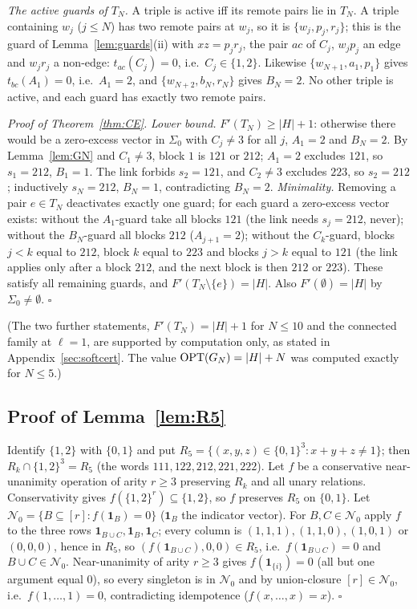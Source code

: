 \emph{The active guards of $T_N$.} A triple is active iff its remote pairs lie in $T_N$. A triple containing $w_j$ ($j\le N$) has two remote pairs at $w_j$, so it is $\{w_j,p_j,r_j\}$; this is the guard of Lemma~\ref{lem:guards}(ii) with $xz=p_jr_j$, the pair $ac$ of $C_j$, $w_jp_j$ an edge and $w_jr_j$ a non-edge: $t_{ac}(C_j)=0$, i.e.\ $C_j\in\{1,2\}$. Likewise $\{w_{N+1},a_1,p_1\}$ gives $t_{bc}(A_1)=0$, i.e.\ $A_1=2$, and $\{w_{N+2},b_N,r_N\}$ gives $B_N=2$. No other triple is active, and each guard has exactly two remote pairs.

\emph{Proof of Theorem~\ref{thm:CE}.} \emph{Lower bound.} $F'(T_N)\ge|H|+1$: otherwise there would be a zero-excess vector in $\Sigma_0$ with $C_j\ne3$ for all $j$, $A_1=2$ and $B_N=2$. By Lemma~\ref{lem:GN} and $C_1\ne3$, block $1$ is $121$ or $212$; $A_1=2$ excludes $121$, so $s_1=212$, $B_1=1$. The link forbids $s_2=121$, and $C_2\ne3$ excludes $223$, so $s_2=212$; inductively $s_N=212$, $B_N=1$, contradicting $B_N=2$. \emph{Minimality.} Removing a pair $e\in T_N$ deactivates exactly one guard; for each guard a zero-excess vector exists: without the $A_1$-guard take all blocks $121$ (the link needs $s_j=212$, never); without the $B_N$-guard all blocks $212$ ($A_{j+1}=2$); without the $C_k$-guard, blocks $j<k$ equal to $212$, block $k$ equal to $223$ and blocks $j>k$ equal to $121$ (the link applies only after a block $212$, and the next block is then $212$ or $223$). These satisfy all remaining guards, and $F'(T_N\setminus\{e\})=|H|$. Also $F'(\emptyset)=|H|$ by $\Sigma_0\ne\emptyset$. \hfill$\square$

(The two further statements, $F'(T_N)=|H|+1$ for $N\le10$ and the connected family at $\ell=1$, are supported by computation only, as stated in Appendix~\ref{sec:softcert}. The value $\mathrm{OPT}(G_N)=|H|+N$ was computed exactly for $N\le5$.)

\subsection{Proof of Lemma~\ref{lem:R5}}\label{app:softR5}
Identify $\{1,2\}$ with $\{0,1\}$ and put $R_5=\{(x,y,z)\in\{0,1\}^3:x+y+z\ne1\}$; then $R_k\cap\{1,2\}^3=R_5$ (the words $111,122,212,221,222$). Let $f$ be a conservative near-unanimity operation of arity $r\ge3$ preserving $R_k$ and all unary relations. Conservativity gives $f(\{1,2\}^r)\subseteq\{1,2\}$, so $f$ preserves $R_5$ on $\{0,1\}$. Let $\mathcal N_0=\{B\subseteq[r]:f(\mathbf 1_B)=0\}$ ($\mathbf 1_B$ the indicator vector). For $B,C\in\mathcal N_0$ apply $f$ to the three rows $\mathbf 1_{B\cup C},\mathbf 1_B,\mathbf 1_C$; every column is $(1,1,1),(1,1,0),(1,0,1)$ or $(0,0,0)$, hence in $R_5$, so $(f(\mathbf 1_{B\cup C}),0,0)\in R_5$, i.e.\ $f(\mathbf 1_{B\cup C})=0$ and $B\cup C\in\mathcal N_0$. Near-unanimity of arity $r\ge3$ gives $f(\mathbf 1_{\{i\}})=0$ (all but one argument equal $0$), so every singleton is in $\mathcal N_0$ and by union-closure $[r]\in\mathcal N_0$, i.e.\ $f(1,\dots,1)=0$, contradicting idempotence ($f(x,\dots,x)=x$). \hfill$\square$

